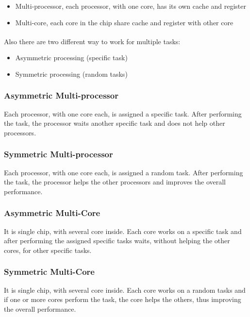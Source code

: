 \begin{itemize}
    \item Multi-processor, each processor, with one core, has its own cache and register
    \item Multi-core, each core in the chip share cache and register with other core
\end{itemize}

\paragraph{}
Also there are two different way to work for multiple tasks:

\begin{itemize}
    \item Asymmetric processing (specific task)
    \item Symmetric processing (random tasks)
\end{itemize}


\subsubsection{Asymmetric Multi-processor}
Each processor, with one core each, is assigned a specific task. After performing the task, the processor waits another specific task and does not help other processors.

\subsubsection{Symmetric Multi-processor}
Each processor, with one core each, is assigned a random task. After performing the task, the processor helps the other processors and improves the overall performance.

\subsubsection{Asymmetric Multi-Core}
It is single chip, with several core inside. Each core works on a specific task and after performing the assigned specific tasks waits, without helping the other cores, for other specific tasks. 

\subsubsection{Symmetric Multi-Core}
It is single chip, with several core inside. Each core works on a random tasks and if one or more cores perform the task, the core helps the others, thus improving the overall performance.


